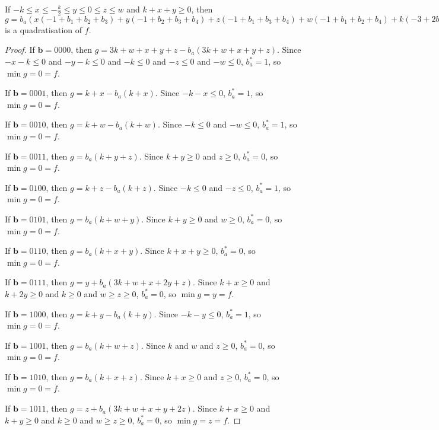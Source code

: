 \documentclass[11pt]{scrartcl}
\newcommand{\vc}[1]{\boldsymbol{#1}}
\begin{document}
\begin{lemma}
	\label{case3}
	If $-k\le x \le -\frac{k}{2} \le y \le 0 \le z \le w $ and $k + x + y \ge 0$, then $g = b_a(x(-1+b_1+b_2+b_3)+y(-1+b_2+b_3+b_4)+z(-1+b_1+b_3+b_4)+w(-1+b_1+b_2+b_4)+k(-3+2b_1+2b_2+2b_3+2b_4))+x(+1 -b_1-b_2-b_3+b_1b_2+b_1b_3+b_2b_3)+y(+1 -b_2-b_3-b_4+b_2b_3+b_2b_4+b_3b_4)+z(+1 -b_1-b_3-b_4+b_1b_3+b_1b_4+b_3b_4)+w(+1 -b_1-b_2-b_4+b_1b_2+b_1b_4+b_2b_4)+k(+3 -2 b_1-2 b_2-2 b_3-2 b_4+b_1b_2+b_1b_3+b_1b_4+b_2b_3+b_2b_4+b_3b_4)$ 
	is a quadratisation of $f$.
 \end{lemma}

\begin{proof}
If $\vc b = 0000$, then $g = 3k + w + x + y + z - b_a(3k + w + x + y + z)$. Since $-x - k \le 0$ and $-y - k \le 0$ and $-k \le 0$ 
and $-z \le 0$ and $-w \le 0$, $b_a^* = 1$, so $\min g = 0 = f$.

If $\vc b = 0001$, then $g = k + x - b_a(k + x)$. 
Since $-k -x \le 0$, $b_a^* = 1$, so $\min g = 0 = f$.

If $\vc b = 0010$, then $g = k + w - b_a(k + w)$.
Since $-k \le 0$ and $-w \le 0$, $b_a^* = 1$, so $\min g = 0 = f$.

If $\vc b = 0011$, then $g = b_a(k + y + z)$.
Since $k + y \ge 0 $ and $z \ge 0$, $b_a^* = 0$, so $\min g = 0 = f$.

If $\vc b = 0100$, then $g = k + z - b_a(k + z)$.
Since $-k \le 0$ and $-z \le 0$, $b_a^* = 1$, so $\min g = 0 = f$.

If $\vc b = 0101$, then $g = b_a(k + w + y)$.
Since $k + y \ge 0 $ and $w \ge 0$, $b_a^* = 0 $, so $\min g = 0 = f$.

If $\vc b = 0110$, then $g = b_a(k + x + y)$. Since $k + x + y \ge 0$, $b_a^* = 0$, so $\min g = 0 = f$.

If $\vc b = 0111$, then $g = y + b_a(3k + w + x + 2y + z)$. Since $k + x \ge 0$ and $k + 2y \ge 0$ and $k \ge 0 $ and $w \ge z \ge 0$, 
$b_a^* = 0$, so $\min g = y = f$.

If $\vc b = 1000$, then $g = k + y - b_a(k + y)$. Since $-k - y \le 0$, $b_a^* = 1$, so $\min g = 0 = f$.

If $\vc b = 1001$, then $g = b_a(k + w + z)$.
Since $k$ and $w$ and $z \ge 0$, $b_a^* = 0$, so $\min g = 0 = f$.

If $\vc b = 1010$, then $g = b_a(k + x + z)$.
Since $k + x \ge 0 $ and $z \ge 0$, $b_a^* = 0$, so $\min g = 0 = f$.

If $\vc b = 1011$, then $g = z + b_a(3k + w + x + y + 2z)$.
Since $k + x \ge 0$ and $k + y \ge 0$ and $k \ge 0 $ and $w \ge z \ge 0 $, $b_a^* = 0$, so $\min g = z = f$.


\end{proof}
\end{document}
